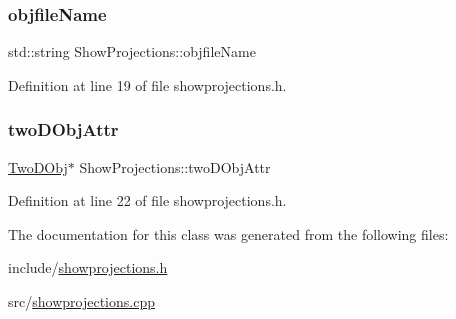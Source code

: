 \subsubsection{\texorpdfstring{objfile\+Name}{objfileName}}
{\footnotesize\ttfamily std\+::string Show\+Projections\+::objfile\+Name}



Definition at line 19 of file showprojections.\+h.

\mbox{\label{class_show_projections_a2fcd6111dcc0b378a7908a4e0ea2cd96}} 
\subsubsection{\texorpdfstring{two\+D\+Obj\+Attr}{twoDObjAttr}}
{\footnotesize\ttfamily \mbox{\hyperlink{class_two_d_obj}{Two\+D\+Obj}}$\ast$ Show\+Projections\+::two\+D\+Obj\+Attr}



Definition at line 22 of file showprojections.\+h.



The documentation for this class was generated from the following files\+:\begin{DoxyCompactItemize}
\item 
include/\mbox{\hyperlink{showprojections_8h}{showprojections.\+h}}\item 
src/\mbox{\hyperlink{showprojections_8cpp}{showprojections.\+cpp}}\end{DoxyCompactItemize}
